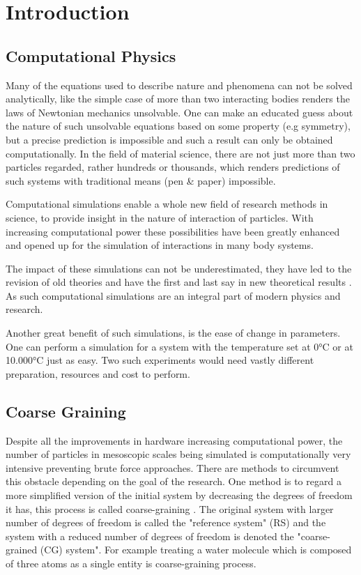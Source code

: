 \documentclass[10pt]{article}
\begin{document}
\section{Introduction}

    \subsection{Computational Physics}
    
        Many of the equations used to describe nature and phenomena can not be solved analytically, like the simple case of more than two interacting bodies renders the laws of Newtonian mechanics unsolvable. One can make an educated guess about the nature of such unsolvable equations based on some property (e.g symmetry), but a precise prediction is impossible and such a result can only be obtained computationally. In the field of material science, there are not just more than two particles regarded, rather hundreds or thousands, which renders predictions of such systems with traditional means (pen \& paper) impossible. 
    
        Computational simulations enable a whole new field of research methods in science, to provide insight in the nature of interaction of particles. With increasing computational power these possibilities have been greatly enhanced and opened up for the simulation of interactions in many body systems. 

        The impact of these simulations can not be underestimated, they have led to the revision of old theories and have the first and last say in new theoretical results \cite{Frenkel}. As such computational simulations are an integral part of modern physics and research.

        Another great benefit of such simulations, is the ease of change in parameters. One can perform a simulation for a system with the temperature set at 0°C or at 10.000°C just as easy. Two such experiments would need vastly different preparation, resources and cost to perform. 
        
    \subsection{Coarse Graining}
    
        Despite all the improvements in hardware increasing computational power, the number of particles in mesoscopic scales being simulated is computationally very intensive preventing brute force approaches. There are methods to circumvent this obstacle depending on the goal of the research. One method is to regard a more simplified version of the initial system by decreasing the degrees of freedom it has, this process is called coarse-graining \cite{Reith}. The original system with larger number of degrees of freedom is called the "reference system" (RS) and the system with a reduced number of degrees of freedom is denoted the "coarse-grained (CG) system". For example treating a water molecule which is composed of three atoms as a single entity is coarse-graining process.
\end{document}
